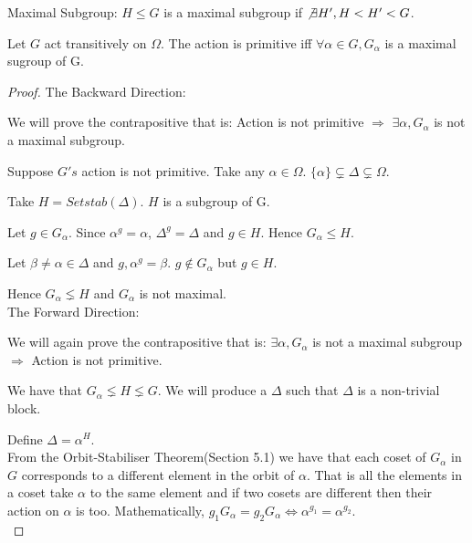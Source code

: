 
\begin{defn}{Maximal Subgroup:}
$H \leq G$ is a maximal subgroup if $\not \exists H',H < H' < G$.
\end{defn}

\begin{lemma}
Let $G$ act transitively on $\Omega$. The action is primitive iff $\forall \alpha \in G, G_\alpha$ is a maximal sugroup of G. 
\end{lemma}

\begin{proof}
The Backward Direction:

We will prove the contrapositive that is: Action is not primitive $\Rightarrow$ $\exists \alpha, G_\alpha$ is not a maximal subgroup.

Suppose $G's$ action is not primitive. Take any $\alpha \in \Omega$. $\{\alpha\} \subsetneq \Delta \subsetneq \Omega$. 

Take $H = Setstab(\Delta)$. $H$ is a subgroup of G.

Let $g \in G_\alpha$. Since $\alpha^g = \alpha$, $\Delta^g = \Delta$ and $g \in H$. Hence $G_\alpha \leq H$.

Let $\beta \neq \alpha \in \Delta$ and $g, \alpha^g = \beta$. $g \notin G_\alpha$ but $g \in H$. 

Hence $G_\alpha \lneq H$ and $G_\alpha$ is not maximal. \\

The Forward Direction:

We will again prove the contrapositive that is: $\exists \alpha, G_\alpha$ is not a maximal subgroup $\Rightarrow$ Action is not primitive.

We have that $G_\alpha \lneq H \lneq G$. We will produce a $\Delta$ such that $\Delta$ is a non-trivial block.


Define $\Delta = \alpha^H$. \\

From the Orbit-Stabiliser Theorem(Section 5.1) we have that each coset of $G_\alpha$ in $G$ corresponds to a different element in the orbit of $\alpha$. That is all the elements in a coset take $\alpha$ to the same element and if two cosets are different then their action on $\alpha$ is too. Mathematically, $g_1G_\alpha = g_2G_\alpha \Leftrightarrow \alpha^{g_1} = \alpha^{g_2}$.\\


\end{proof}
